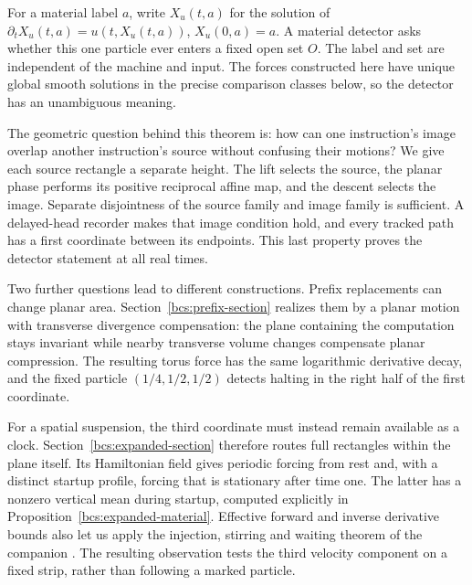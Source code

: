 \documentclass[11pt]{article}
\begin{document}
For a material label $a$, write $X_u(t,a)$ for the solution of
$\partial_tX_u(t,a)=u(t,X_u(t,a))$, $X_u(0,a)=a$.
A material detector asks whether this one particle ever enters a fixed open set $O$. The label and set are independent of the machine and input. The forces constructed here have unique global smooth solutions in the precise comparison classes below, so the detector has an unambiguous meaning.

The geometric question behind this theorem is: how can one instruction's image overlap another instruction's source without confusing their motions? We give each source rectangle a separate height. The lift selects the source, the planar phase performs its positive reciprocal affine map, and the descent selects the image. Separate disjointness of the source family and image family is sufficient. A delayed-head recorder makes that image condition hold, and every tracked path has a first coordinate between its endpoints. This last property proves the detector statement at all real times.

Two further questions lead to different constructions. Prefix replacements can change planar area. Section~\ref{bcs:prefix-section} realizes them by a planar motion with transverse divergence compensation: the plane containing the computation stays invariant while nearby transverse volume changes compensate planar compression. The resulting torus force has the same logarithmic derivative decay, and the fixed particle $(1/4,1/2,1/2)$ detects halting in the right half of the first coordinate.

For a spatial suspension, the third coordinate must instead remain available as a clock. Section~\ref{bcs:expanded-section} therefore routes full rectangles within the plane itself. Its Hamiltonian field gives periodic forcing from rest and, with a distinct startup profile, forcing that is stationary after time one. The latter has a nonzero vertical mean during startup, computed explicitly in Proposition~\ref{bcs:expanded-material}. Effective forward and inverse derivative bounds also let us apply the injection, stirring and waiting theorem of the companion \cite[Theorem~3.1]{velocity2026}. The resulting observation tests the third velocity component on a fixed strip, rather than following a marked particle.
\end{document}

